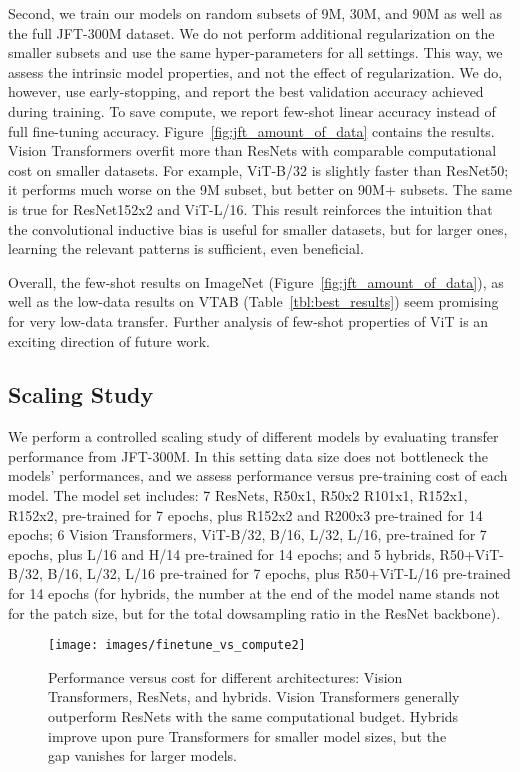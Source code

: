 \documentclass{article} \usepackage{iclr2021_conference,times}
\newcommand{\oursabbrv}{ViT\xspace}
\newcommand{\oursfull}{Vision Transformer\xspace}
\begin{document}
Second, we train our models on random subsets of 9M, 30M, and 90M as well as the full JFT-300M dataset.
We do not perform additional regularization on the smaller subsets and use the same hyper-parameters for all settings.
This way, we assess the intrinsic model properties, and not the effect of regularization.
We do, however, use early-stopping, and report the best validation accuracy achieved during training.
To save compute, we report few-shot linear accuracy instead of full fine-tuning accuracy.
Figure~\ref{fig:jft_amount_of_data} contains the results.
\oursfull{}s overfit more than ResNets with comparable computational cost on smaller datasets. 
For example, \oursabbrv-B/32 is slightly faster than ResNet50; it performs much worse on the 9M subset, but better on 90M+ subsets.
The same is true for ResNet152x2 and \oursabbrv-L/16.
This result reinforces the intuition that the convolutional inductive bias is useful for smaller datasets, but for larger ones, learning the relevant patterns is sufficient, even beneficial.

Overall, the few-shot results on ImageNet (Figure~\ref{fig:jft_amount_of_data}), as well as the low-data results on VTAB (Table~\ref{tbl:best_results}) seem promising for very low-data transfer. Further analysis of few-shot properties of \oursabbrv{} is an exciting direction of future work.






\subsection{Scaling Study}
\label{sec:scaling_architectures}

We perform a controlled scaling study of different models by evaluating transfer performance from JFT-300M.
In this setting data size does not bottleneck the models' performances, and we assess performance versus pre-training cost of each model.
The model set includes: 
7 ResNets, R50x1, R50x2 R101x1, R152x1, R152x2, pre-trained for 7 epochs, plus R152x2 and R200x3 pre-trained for 14 epochs;
6 \oursfull{}s, \oursabbrv-B/32, B/16, L/32, L/16, pre-trained for 7 epochs, plus L/16 and H/14 pre-trained for 14 epochs;
and 5 hybrids, R50+\oursabbrv-B/32, B/16, L/32, L/16 pre-trained for 7 epochs, plus R50+\oursabbrv-L/16 pre-trained for 14 epochs (for hybrids, the number at the end of the model name stands not for the patch size, but for the total dowsampling ratio in the ResNet backbone).

\begin{figure}
\begin{center}
\texttt{[image: images/finetune\_vs\_compute2]}
\vspace{-3mm}
\end{center}
\caption{Performance versus cost for different architectures: \oursfull{}s, ResNets, and hybrids. \oursfull{}s generally outperform ResNets with the same computational budget. Hybrids improve upon pure Transformers for smaller model sizes, but the gap vanishes for larger models.}
\vspace{-3mm}
\label{fig:scaling_architectures}
\end{figure}
\end{document}

